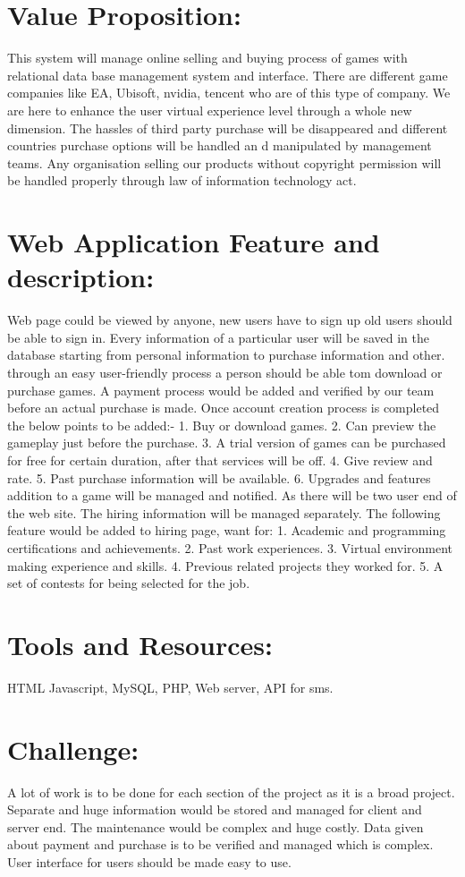 \documentclass{article}
\begin{document}
\section{Value Proposition:}
This system will manage online selling and buying process of games with relational data base management system and interface. There are different game companies like EA, Ubisoft, nvidia, tencent who are of this type of company. We are here to enhance the user virtual experience level through a whole new dimension. The hassles of third party purchase will be disappeared and different countries purchase options will be handled an d manipulated by management teams. Any organisation selling our products without copyright permission will be handled properly through law of information  technology act.

\section{Web Application Feature and description:}
Web page could be viewed by anyone, new users have to sign up old
users should be able to sign in. Every information of a particular user will be saved in the database starting from personal information to purchase information and other. through an easy user-friendly process a person should be able tom download or purchase games. A payment process would be added and verified by our team before an actual purchase is made. Once account creation process is completed the below points to be added:-
1. Buy or download games.
2. Can preview the gameplay just before the purchase.
3. A trial version of games can be purchased for free for certain duration, after that services will be off.
4. Give review and rate.
5. Past purchase information will be available.
6. Upgrades and features addition to a game will be managed and notified.
As there will be two user end of the web site. The hiring information will be managed separately. The following feature would be added to hiring page, want for:
1. Academic and programming certifications and achievements.
2. Past work experiences.
3. Virtual environment making experience and skills.
4. Previous related projects they worked for.
5. A set of contests for being selected for the job.
\section{Tools and Resources:}
HTML
Javascript,
MySQL,
PHP,
Web server,
API for sms.
\section{Challenge:}
A lot of work is to be done for each section of the project as it is a broad project. Separate and huge information would be stored and managed for client and server end. The maintenance would be complex and huge costly. Data given about payment and purchase is to be verified and managed which is complex. User interface for users should be made easy to use. 
\end{document}
